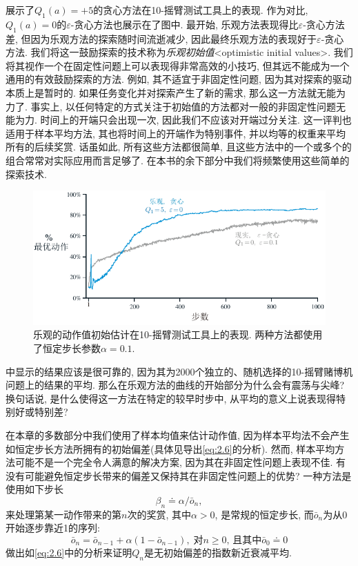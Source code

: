 展示了$Q_1(a) = +5$的贪心方法在10-摇臂测试工具上的表现. 作为对比, $Q_1(a) = 0$的$\varepsilon$-贪心方法也展示在了图中. 最开始, 乐观方法表现得比$\varepsilon$-贪心方法差, 但因为乐观方法的探索随时间流逝减少, 因此最终乐观方法的表现好于$\varepsilon$-贪心方法. 我们将这一鼓励探索的技术称为\emph{乐观初始值}<optimistic initial values>. 我们将其视作一个在固定性问题上可以表现得非常高效的小技巧, 但其远不能成为一个通用的有效鼓励探索的方法. 例如, 其不适宜于非固定性问题, 因为其对探索的驱动本质上是暂时的. 如果任务变化并对探索产生了新的需求, 那么这一方法就无能为力了. 事实上, 以任何特定的方式关注于初始值的方法都对一般的非固定性问题无能为力. 时间上的开端只会出现一次, 因此我们不应该对开端过分关注. 这一评判也适用于样本平均方法, 其也将时间上的开端作为特别事件, 并以均等的权重来平均所有的后续奖赏. 话虽如此, 所有这些方法都很简单, 且这些方法中的一个或多个的组合常常对实际应用而言足够了. 在本书的余下部分中我们将频繁使用这些简单的探索技术.

\begin{figure}[ht]
\centering
\includegraphics[width=.75\textwidth]{c2/img/figure2-3.pdf}
\caption{乐观的动作值初始估计在10-摇臂测试工具上的表现. 两种方法都使用了恒定步长参数$\alpha = 0.1$.}\label{fig:2.3}
\end{figure}

\begin{exer}[神秘的尖峰]
中显示的结果应该是很可靠的, 因为其为2000个独立的、随机选择的10-摇臂赌博机问题上的结果的平均. 那么在乐观方法的曲线的开始部分为什么会有震荡与尖峰? 换句话说, 是什么使得这一方法在特定的较早时步中, 从平均的意义上说表现得特别好或特别差?
\end{exer}

\begin{exer}[无偏的恒定步长技巧]
在本章的多数部分中我们使用了样本均值来估计动作值, 因为样本平均法不会产生如恒定步长方法所拥有的初始偏差(具体见导出\eqref{eq:2.6}的分析). 然而, 样本平均方法可能不是一个完全令人满意的解决方案, 因为其在非固定性问题上表现不佳. 有没有可能避免恒定步长带来的偏差又保持其在非固定性问题上的优势? 一种方法是使用如下步长
\begin{equation}\label{eq:2.8}
\beta_n \doteq \alpha / \bar{o}_n,
\end{equation}
来处理第某一动作带来的第$n$次的奖赏, 其中$\alpha > 0$, 是常规的恒定步长, 而$\bar{o}_n$为从0开始逐步靠近1的序列:
\begin{equation}\label{eq:2.9}
\bar{o}_n = \bar{o}_{n - 1} + \alpha (1 - \bar{o}_{n - 1}), \; \text{对} n \geq 0 \text{, 且其中} \bar{o}_0 \doteq 0
\end{equation}
做出如\eqref{eq:2.6}中的分析来证明$Q_n$是无初始偏差的指数新近衰减平均.
\end{exer}

